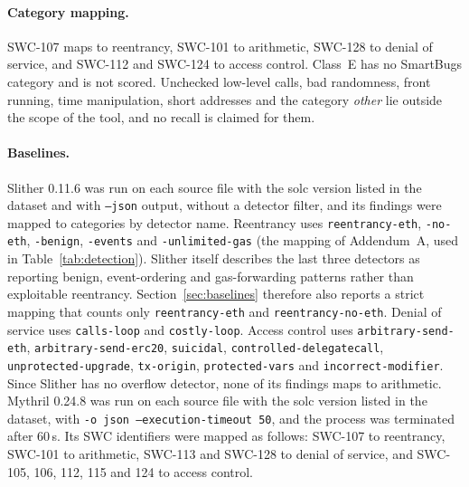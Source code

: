 \documentclass[pdflatex,sn-mathphys]{sn-jnl}
\theoremstyle{thmstyletwo}
\theoremstyle{thmstyletwo}
\begin{document}
\paragraph{Category mapping.} SWC-107 maps to reentrancy, SWC-101 to arithmetic, SWC-128 to denial of service, and SWC-112 and SWC-124 to access control. Class~E has no SmartBugs category and is not scored. Unchecked low-level calls, bad randomness, front running, time manipulation, short addresses and the category \emph{other} lie outside the scope of the tool, and no recall is claimed for them.

\paragraph{Baselines.} Slither 0.11.6 was run on each source file with the solc version listed in the dataset and with \texttt{--json} output, without a detector filter, and its findings were mapped to categories by detector name. Reentrancy uses \texttt{reentrancy-eth}, \texttt{-no-eth}, \texttt{-benign}, \texttt{-events} and \texttt{-unlimited-gas} (the mapping of Addendum~A, used in Table~\ref{tab:detection}). Slither itself describes the last three detectors as reporting benign, event-ordering and gas-forwarding patterns rather than exploitable reentrancy. Section~\ref{sec:baselines} therefore also reports a strict mapping that counts only \texttt{reentrancy-eth} and \texttt{reentrancy-no-eth}. Denial of service uses \texttt{calls-loop} and \texttt{costly-loop}. Access control uses \texttt{arbitrary-send-eth}, \texttt{arbitrary-send-erc20}, \texttt{suicidal}, \texttt{controlled-delegatecall}, \texttt{unprotected-upgrade}, \texttt{tx-origin}, \texttt{protected-vars} and \texttt{incorrect-modifier}. Since Slither has no overflow detector, none of its findings maps to arithmetic. Mythril 0.24.8 was run on each source file with the solc version listed in the dataset, with \texttt{-o json --execution-timeout 50}, and the process was terminated after 60\,s. Its SWC identifiers were mapped as follows: SWC-107 to reentrancy, SWC-101 to arithmetic, SWC-113 and SWC-128 to denial of service, and SWC-105, 106, 112, 115 and 124 to access control.
\end{document}
